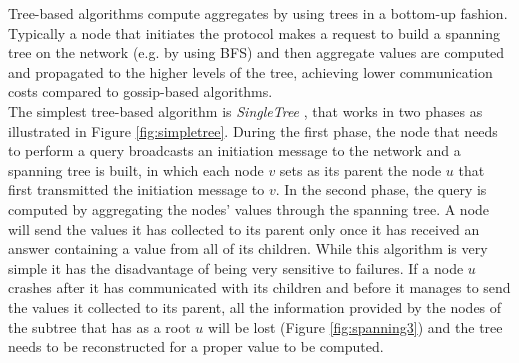 \documentclass[a4paper,11pt,twoside]{report}
\begin{document}
Tree-based algorithms compute aggregates by using trees in a bottom-up fashion. Typically a node that initiates the protocol makes a request to build a spanning tree on the network (e.g. by using BFS) and then aggregate values are computed and propagated to the higher levels of the tree, achieving lower communication costs compared to gossip-based algorithms. \\

The simplest tree-based algorithm is \textit{SingleTree} \cite{Bawa03estimatingaggregates}, that works in two phases as illustrated in Figure \ref{fig:simpletree}. During the first phase, the node that needs to perform a query broadcasts an initiation message to the network and a spanning tree is built, in which each node $v$ sets as its parent the node $u$ that first transmitted the initiation message to $v$. In the second phase, the query is computed by aggregating the nodes' values through the spanning tree. A node will send the values it has collected to its parent only once it has received an answer containing a value from all of its children. While this algorithm is very simple it has the disadvantage of being very sensitive to failures. If a node $u$ crashes after it has communicated with its children and before it manages to send the values it collected to its parent, all the information provided by the nodes of the subtree that has as a root $u$ will be lost (Figure \ref{fig:spanning3}) and the tree needs to be reconstructed for a proper value to be computed. 
\end{document}

